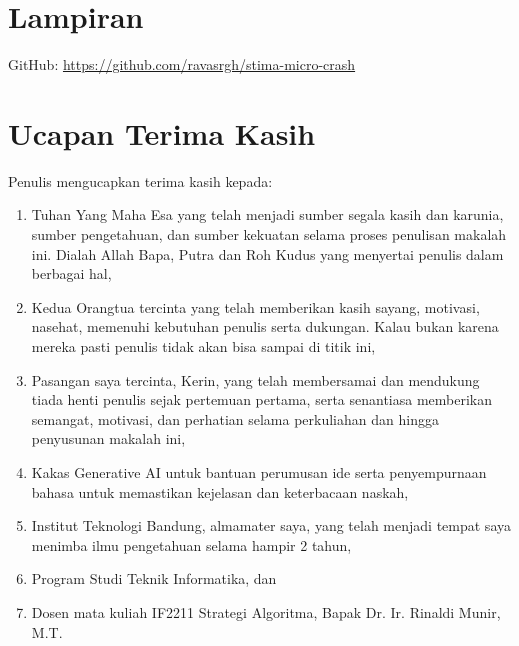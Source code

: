 \documentclass[conference]{IEEEtran}
\begin{document}
\section*{Lampiran}
GitHub: \url{https://github.com/ravasrgh/stima-micro-crash}

\section*{Ucapan Terima Kasih}
Penulis mengucapkan terima kasih kepada: 
\begin{enumerate}
    \item Tuhan Yang Maha Esa yang telah menjadi sumber segala kasih dan karunia, sumber pengetahuan, dan sumber kekuatan selama proses penulisan makalah ini. Dialah Allah Bapa, Putra dan Roh Kudus yang menyertai penulis dalam berbagai hal,
    \item Kedua Orangtua tercinta yang telah memberikan kasih sayang, motivasi, nasehat, memenuhi kebutuhan penulis serta dukungan. Kalau bukan karena mereka pasti penulis tidak akan bisa sampai di titik ini,
    \item Pasangan saya tercinta, Kerin, yang telah membersamai dan mendukung tiada henti penulis sejak pertemuan pertama, serta senantiasa memberikan semangat, motivasi, dan perhatian selama perkuliahan dan hingga penyusunan makalah ini,
    \item Kakas Generative AI untuk bantuan perumusan ide serta penyempurnaan bahasa untuk memastikan kejelasan dan keterbacaan naskah,
    \item Institut Teknologi Bandung, almamater saya, yang telah menjadi tempat saya menimba ilmu pengetahuan selama hampir 2 tahun, 
    \item Program Studi Teknik Informatika, dan 
    \item Dosen mata kuliah IF2211 Strategi Algoritma, Bapak Dr. Ir. Rinaldi Munir, M.T.
\end{enumerate}
\end{document}
